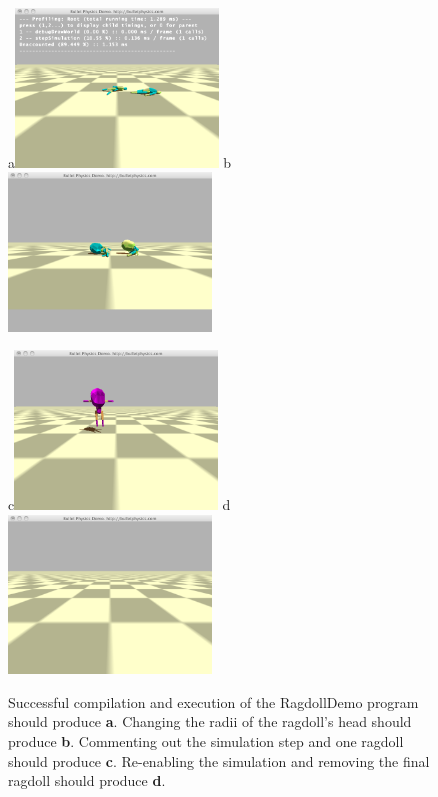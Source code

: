 \documentclass[12pt]{article}
\begin{document}
\begin{figure}[!t]
\centerline{
a\includegraphics[width=0.48\textwidth]{Fig1a}
b\includegraphics[width=0.48\textwidth]{Fig1b}
}
\centerline{
c\includegraphics[width=0.48\textwidth]{Fig2}
d\includegraphics[width=0.48\textwidth]{Fig1d}
}
\caption{
Successful compilation and execution of the RagdollDemo program should produce \textbf{a}.
Changing the radii of the ragdoll's head should produce \textbf{b}.
Commenting out the simulation step and one ragdoll should produce \textbf{c}. 
Re-enabling the simulation and removing the final ragdoll should produce \textbf{d}.}
\label{Fig}
\end{figure}
\end{document}
